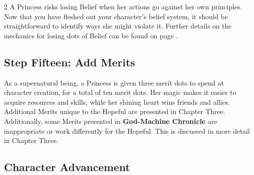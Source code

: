 \begin{multicols}{2}
\noindent A Princess risks losing Belief when her actions go against her own principles. Now that you have fleshed out your character's belief system, it should be straightforward to identify ways she might violate it. Further details on the mechanics for losing dots of Belief can be found on page \pageref{subsec:Belief}.

\subsection*{Step Fifteen: Add Merits} 

As a supernatural being, a Princess is given three merit dots to spend at character creation, for a total of ten merit dots. Her magic makes it easier to acquire resources and skills, while her shining heart wins friends and allies. Additional Merits unique to the Hopeful are presented in Chapter Three. Additionally, some Merits presented in \textbf{God-Machine Chronicle} are inappropriate or work differently for the Hopeful. This is discussed in more detail in Chapter Three. 




\bigsidebarstart

\subsection*{Character Advancement}


\end{multicols}
